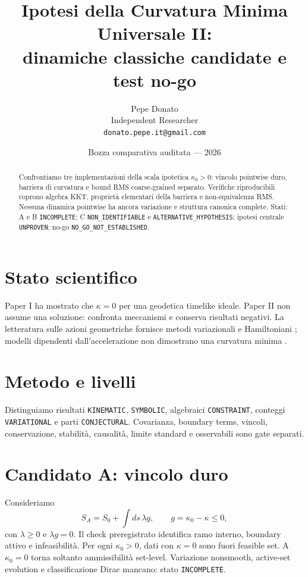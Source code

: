 \documentclass[11pt,a4paper]{article}
\title{Ipotesi della Curvatura Minima Universale II:\\dinamiche classiche candidate e test no-go}
\author{Pepe Donato\\Independent Researcher\\\texttt{donato.pepe.it@gmail.com}}
\date{Bozza comparativa auditata --- 2026}
\begin{document}
\maketitle

\begin{abstract}
Confrontiamo tre implementazioni della scala ipotetica $\kappa_0>0$: vincolo pointwise duro, barriera di curvatura e bound RMS coarse-grained separato. Verifiche riproducibili coprono algebra KKT, proprietà elementari della barriera e non-equivalenza RMS. Nessuna dinamica pointwise ha ancora variazione e struttura canonica complete. Stati: A e B \texttt{INCOMPLETE}; C \texttt{NON\_IDENTIFIABLE} e \texttt{ALTERNATIVE\_HYPOTHESIS}; ipotesi centrale \texttt{UNPROVEN}; no-go \texttt{NO\_GO\_NOT\_ESTABLISHED}.
\end{abstract}

\section{Stato scientifico}\label{sec:p2-status}
Paper I ha mostrato che $\kappa=0$ per una geodetica timelike ideale. Paper II non assume una soluzione: confronta meccanismi e conserva risultati negativi. La letteratura sulle azioni geometriche fornisce metodi variazionali e Hamiltoniani \cite{ArreagaCapovillaGuven2001,CapovillaGuvenRojas2002}; modelli dipendenti dall'accelerazione non dimostrano una curvatura minima \cite{NesterenkoEtAl1995}.

\section{Metodo e livelli}\label{sec:p2-method}
Distinguiamo risultati \texttt{KINEMATIC}, \texttt{SYMBOLIC}, algebraici \texttt{CONSTRAINT}, conteggi \texttt{VARIATIONAL} e parti \texttt{CONJECTURAL}. Covarianza, boundary terms, vincoli, conservazione, stabilità, causalità, limite standard e osservabili sono gate separati.

\section{Candidato A: vincolo duro}\label{sec:p2-a}
Consideriamo
\begin{equation}\label{eq:p2-hard}
S_A=S_0+\int ds\,\lambda g,\qquad g=\kappa_0-\kappa\le0,
\end{equation}
con $\lambda\ge0$ e $\lambda g=0$. Il check preregistrato identifica ramo interno, boundary attivo e infeasibilità. Per ogni $\kappa_0>0$, dati con $\kappa=0$ sono fuori feasible set. A $\kappa_0=0$ torna soltanto ammissibilità set-level. Variazione nonsmooth, active-set evolution e classificazione Dirac mancano: stato \texttt{INCOMPLETE}.
\end{document}
